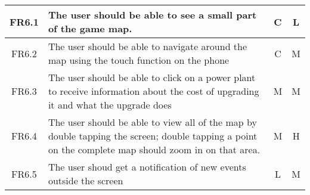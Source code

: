 \begin{longtable}{| c | p{8cm} | c | c |}
   FR6.1 & The user should be able to see a small part of the game map. & C & L \\ \hline

   FR6.2 & The user should be able to navigate around the map using the touch function on the phone & C & M \\ \hline

   FR6.3 & The user should be able to click on a power plant to receive information about the cost 
   of upgrading it and what the upgrade does & M & M \\ \hline

   FR6.4 & The user should be able to view all of the map by double tapping the screen; double tapping a 
   point on the complete map should zoom in on that area. & M & H \\ \hline

   FR6.5 & The user shoud get a notification of new events outside the screen & L & M \\ \hline

\hline
\end{longtable}
